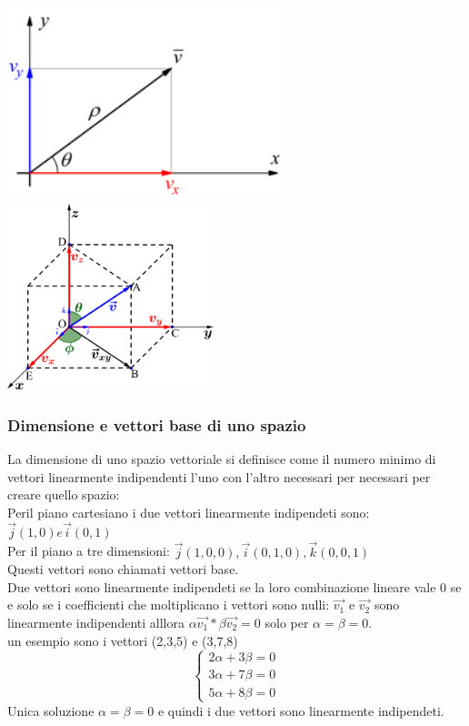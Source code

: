 \documentclass[a4paper]{article}
\begin{document}
\includegraphics[width=8cm]{piano_cartesiano.png}
\includegraphics[width=6cm]{piano_tre_dimensioni.png}
\\
\subsubsection{Dimensione e vettori base di uno spazio}
La dimensione di uno spazio vettoriale si definisce come il numero minimo di vettori linearmente indipendenti l'uno con l'altro necessari per necessari per creare quello spazio:
\\ Peril piano cartesiano i due vettori linearmente indipendeti sono: $\vec{j}(1,0) e \vec{i}(0,1) $
\\ Per il piano a tre dimensioni: $ \vec{j}(1,0,0), \vec{i}(0,1,0), \vec{k}(0,0,1) $
\\ Questi vettori sono chiamati vettori base.
\\Due vettori sono linearmente indipendeti se la loro combinazione lineare vale 0 se e solo se i coefficienti che moltiplicano i vettori sono nulli:
$\vec{v_{1}}$ e $\vec{v_{2}} $ sono linearmente indipendenti alllora $\alpha\vec{v_{1}}*\beta\vec{v_{2}}=0$ solo per $\alpha=\beta=0 $.
\\ un esempio sono i vettori (2,3,5) e (3,7,8) \\
\[\begin{cases}
2\alpha + 3\beta=0\\
3\alpha + 7\beta=0\\
5\alpha + 8\beta=0
\end{cases}
\]
Unica soluzione $\alpha=\beta=0$ e quindi i due vettori sono linearmente indipendeti.
\\
\end{document}
